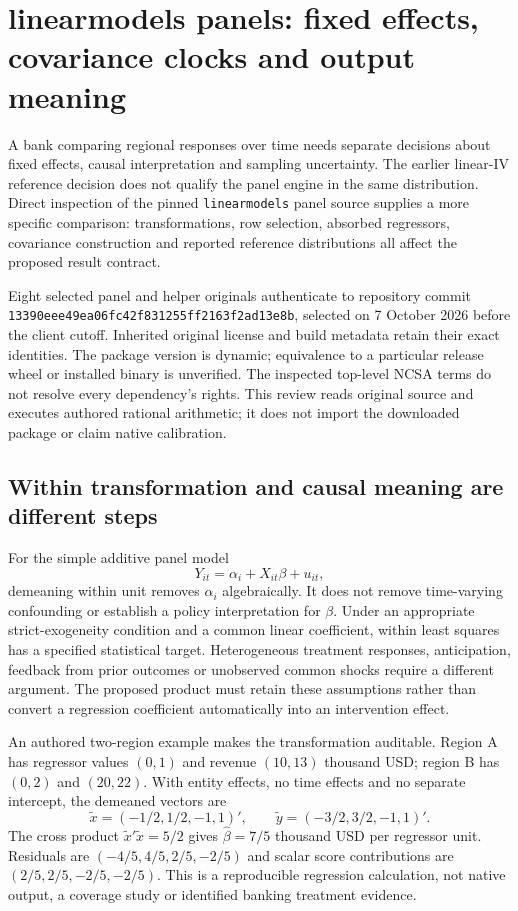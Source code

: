 \section{linearmodels panels: fixed effects, covariance clocks and output meaning}
\label{sec:exec24-linearmodels-panel}

A bank comparing regional responses over time needs separate decisions about
fixed effects, causal interpretation and sampling uncertainty. The earlier
linear-IV reference decision does not qualify the panel engine in the same
distribution. Direct inspection of the pinned \texttt{linearmodels} panel
source supplies a more specific comparison: transformations, row selection,
absorbed regressors, covariance construction and reported reference
distributions all affect the proposed result contract.
\citep{exec22_linearmodels_reuse,exec24_lmpanel_source,exec24_lmpanel_reference}

Eight selected panel and helper originals authenticate to repository commit
\texttt{13390eee49ea06fc42f8\allowbreak 31255ff2163f2ad13e8b}, selected on
7 October 2026 before the client cutoff. Inherited original license and
build metadata retain their exact identities. The package version is dynamic;
equivalence to a particular release wheel or installed binary is unverified.
The inspected top-level NCSA terms do not resolve every dependency's rights.
This review reads original source and executes authored rational arithmetic;
it does not import the downloaded package or claim native calibration.
\citep{exec22_linearmodels_reuse,exec24_lmpanel_source}

\subsection{Within transformation and causal meaning are different steps}
For the simple additive panel model
\[
 Y_{it}=\alpha_i+X_{it}\beta+u_{it},
\]
demeaning within unit removes $\alpha_i$ algebraically. It does not remove
time-varying confounding or establish a policy interpretation for $\beta$.
Under an appropriate strict-exogeneity condition and a common linear
coefficient, within least squares has a specified statistical target.
Heterogeneous treatment responses, anticipation, feedback from prior
outcomes or unobserved common shocks require a different argument. The
proposed product must retain these assumptions rather than convert a
regression coefficient automatically into an intervention effect.
\citep{exec24_lmpanel_reference}

An authored two-region example makes the transformation auditable. Region A
has regressor values $(0,1)$ and revenue $(10,13)$ thousand USD; region B has
$(0,2)$ and $(20,22)$. With entity effects, no time effects and no separate
intercept, the demeaned vectors are
\[
 \widetilde x=(-1/2,1/2,-1,1)',\qquad
 \widetilde y=(-3/2,3/2,-1,1)'.
\]
The cross product $\widetilde x'\widetilde x=5/2$ gives
$\widehat\beta=7/5$ thousand USD per regressor unit. Residuals are
$(-4/5,4/5,2/5,-2/5)$ and scalar score contributions are
$(2/5,2/5,-2/5,-2/5)$. This is a reproducible regression calculation, not
native output, a coverage study or identified banking treatment evidence.
\citep{exec24_lmpanel_reference}

